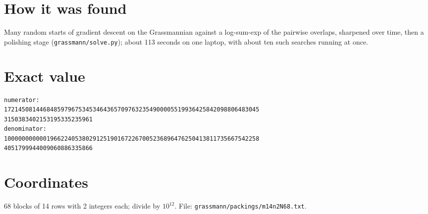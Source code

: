 \documentclass[11pt,a4paper]{article}
\begin{document}
\section{How it was found}
Many random starts of gradient descent on the Grassmannian against a log-sum-exp of the pairwise overlaps, sharpened over time, then a polishing stage (\texttt{grassmann/solve.py}); about 113 seconds on one laptop, with about ten such searches running at once.


\appendix
\section{Exact value}
{\small
\begin{verbatim}
numerator:
172145081446848597967534534643657097632354900005519936425842098806483045
3150383402153195335235961
denominator:
100000000000196622405380291251901672267005236896476250413811735667542258
4051799944009060886335866
\end{verbatim}}

\section{Coordinates}
68 blocks of 14 rows with 2 integers each; divide by $10^{12}$. File: \texttt{grassmann/packings/m14n2N68.txt}.
{\tiny
\begin{multicols}{4}
\end{multicols}}
\end{document}
